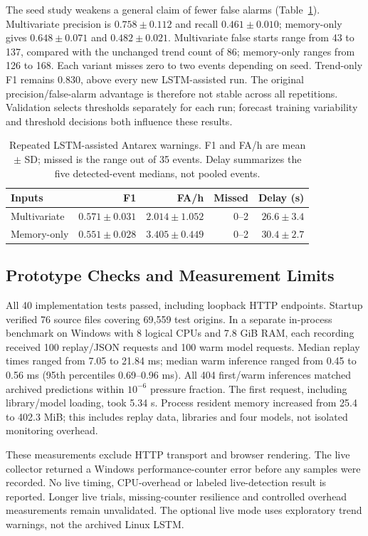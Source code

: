 The seed study weakens a general claim of fewer false alarms (Table~\ref{tab:repeat_warning}). Multivariate precision is $0.758\pm0.112$ and recall $0.461\pm0.010$; memory-only gives $0.648\pm0.071$ and $0.482\pm0.021$. Multivariate false starts range from 43 to 137, compared with the unchanged trend count of 86; memory-only ranges from 126 to 168. Each variant misses zero to two events depending on seed. Trend-only F1 remains 0.830, above every new LSTM-assisted run. The original precision/false-alarm advantage is therefore not stable across all repetitions. Validation selects thresholds separately for each run; forecast training variability and threshold decisions both influence these results.


\begin{table}[htbp]
\caption{Repeated LSTM-assisted Antarex warnings. F1 and FA/h are mean $\pm$ SD; missed is the range out of 35 events. Delay summarizes the five detected-event medians, not pooled events.}
\label{tab:repeat_warning}
\centering\small
\setlength{\tabcolsep}{4pt}
\begin{tabular}{@{}lrrrr@{}}
\toprule
Inputs & F1 & FA/h & Missed & Delay (s)\\
\midrule
Multivariate & $0.571\pm0.031$ & $2.014\pm1.052$ & 0--2 & $26.6\pm3.4$\\
Memory-only & $0.551\pm0.028$ & $3.405\pm0.449$ & 0--2 & $30.4\pm2.7$\\
\bottomrule
\end{tabular}
\end{table}


\subsection{Prototype Checks and Measurement Limits}
All 40 implementation tests passed, including loopback HTTP endpoints. Startup verified 76 source files covering 69,559 test origins. In a separate in-process benchmark on Windows with 8 logical CPUs and 7.8 GiB RAM, each recording received 100 replay/JSON requests and 100 warm model requests. Median replay times ranged from 7.05 to 21.84 ms; median warm inference ranged from 0.45 to 0.56 ms (95th percentiles 0.69--0.96 ms). All 404 first/warm inferences matched archived predictions within $10^{-6}$ pressure fraction. The first request, including library/model loading, took 5.34 s. Process resident memory increased from 25.4 to 402.3 MiB; this includes replay data, libraries and four models, not isolated monitoring overhead.

These measurements exclude HTTP transport and browser rendering. The live collector returned a Windows performance-counter error before any samples were recorded. No live timing, CPU-overhead or labeled live-detection result is reported. Longer live trials, missing-counter resilience and controlled overhead measurements remain unvalidated. The optional live mode uses exploratory trend warnings, not the archived Linux LSTM.
